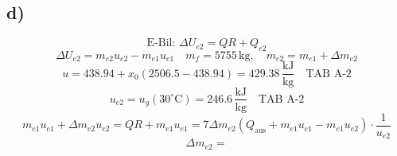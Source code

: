 

\subsection*{d)}
\[
\text{E-Bil: } \Delta U_{e2} = QR + Q_{e2}
\]
\[
\Delta U_{e2} = m_{e2} u_{e2} - m_{e1} u_{e1} \quad m_f = 5755 \, \text{kg}, \quad m_{e2} = m_{e1} + \Delta m_{e2}
\]
\[
u = 438.94 + x_0 (2506.5 - 438.94) = 429.38 \, \frac{\text{kJ}}{\text{kg}} \quad \text{TAB A-2}
\]
\[
u_{e2} = u_g (30^\circ \text{C}) = 246.6 \, \frac{\text{kJ}}{\text{kg}} \quad \text{TAB A-2}
\]
\[
m_{e1} u_{e1} + \Delta m_{e2} u_{e2} = QR + m_{e1} u_{e1} = 7 \Delta m_{e2} (Q_{\text{aus}} + m_{e1} u_{e1} - m_{e1} u_{e2}) \cdot \frac{1}{u_{e2}}
\]
\[
\Delta m_{e2} = 
\]